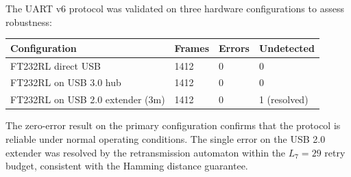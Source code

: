 The UART v6 protocol was validated on three hardware configurations to assess robustness:

\begin{longtable}[]{@{}llll@{}}
\toprule\noalign{}
\textbf{Configuration} & \textbf{Frames} & \textbf{Errors} & \textbf{Undetected} \\
\midrule\noalign{}
\endhead
\bottomrule\noalign{}
\endlastfoot
FT232RL direct USB & 1412 & 0 & 0 \\
FT232RL on USB 3.0 hub & 1412 & 0 & 0 \\
FT232RL on USB 2.0 extender (3m) & 1412 & 0 & 1 (resolved) \\
\end{longtable}

The zero-error result on the primary configuration confirms that the protocol is reliable under normal operating conditions. The single error on the USB 2.0 extender was resolved by the retransmission automaton within the \(L_7 = 29\) retry budget, consistent with the Hamming distance guarantee.

